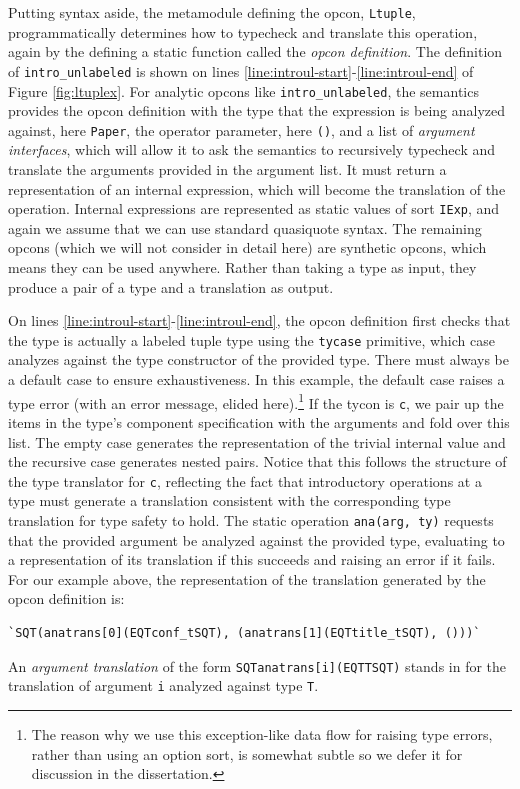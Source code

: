 Putting syntax aside, the metamodule defining the opcon, \lstinline{Ltuple}, programmatically determines how to typecheck and translate this operation, again by the defining a static function called the \emph{opcon definition}. The definition of \lstinline{intro_unlabeled} is shown on lines \ref{line:introul-start}-\ref{line:introul-end} of Figure \ref{fig:ltuplex}. For analytic opcons like \lstinline{intro_unlabeled}, the semantics provides the opcon definition  with the type that the expression is being analyzed against, here \lstinline{Paper}, the operator parameter, here \lstinline{()}, and a list of \emph{argument interfaces}, which will allow it to ask the semantics to recursively typecheck and translate the arguments provided in the argument list. It must return a representation of an  internal expression, which will become the translation of the operation. Internal expressions are represented as static values of sort \lstinline{IExp}, and again we assume that we can use standard quasiquote syntax. The remaining opcons (which we will not consider in detail here) are synthetic opcons, which means they can be used anywhere. Rather than taking a type as input, they produce a pair of a type and a translation as output. 

On lines \ref{line:introul-start}-\ref{line:introul-end}, the opcon definition first checks that the type is actually a labeled tuple type using the \lstinline{tycase} primitive, which case analyzes against the type constructor of the provided type. There must always be a default case to ensure exhaustiveness. In this example, the default case raises a type error (with an error message, elided here).\footnote{The reason why we use this exception-like data flow for raising type errors, rather than using an option sort, is somewhat subtle so we defer it for discussion in the dissertation.} If the tycon is \lstinline{c}, we pair up the items in the type's component specification with the arguments and fold over this list. The empty case generates the representation of the trivial internal value and the recursive case generates nested pairs. Notice that this follows the structure of the type translator for \lstinline{c}, reflecting the fact that introductory operations at a type must generate a translation consistent with the corresponding type translation for type safety to hold. The static operation \lstinline{ana(arg, ty)} requests that the provided argument be analyzed against the provided type, evaluating to a representation of its translation if this succeeds and raising an error if it fails. For our example above, the representation of the translation generated by the opcon definition is:
\begin{lstlisting}[numbers=none]
`SQT(anatrans[0](EQTconf_tSQT), (anatrans[1](EQTtitle_tSQT), ()))`
\end{lstlisting}
An \emph{argument translation} of the form \lstinline{SQTanatrans[i](EQTTSQT)} stands in for the translation of argument \lstinline{i} analyzed against type \lstinline{T}.

